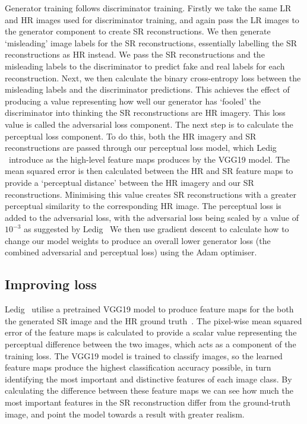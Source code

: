 Generator training follows discriminator training. Firstly we take the same LR and HR images used for discriminator training, and again pass the LR images to the generator component to create SR reconstructions. We then generate `misleading' image labels for the SR reconstructions, essentially labelling the SR reconstructions as HR instead. We pass the SR reconstructions and the misleading labels to the discriminator to predict fake and real labels for each reconstruction. Next, we then calculate the binary cross-entropy loss between the misleading labels and the discriminator predictions. This achieves the effect of producing a value representing how well our generator has `fooled' the discriminator into thinking the SR reconstructions are HR imagery. This loss value is called the adversarial loss component. The next step is to calculate the perceptual loss component. To do this, both the HR imagery and SR reconstructions are passed through our perceptual loss model, which Ledig \etal\ introduce as the high-level feature maps produces by the VGG19 model. The mean squared error is then calculated between the HR and SR feature maps to provide a `perceptual distance' between the HR imagery and our SR reconstructions. Minimising this value creates SR reconstructions with a greater perceptual similarity to the corresponding HR image. The perceptual loss is added to the adversarial loss, with the adversarial loss being scaled by a value of $10^{-3}$ as suggested by Ledig \etal\ We then use gradient descent to calculate how to change our model weights to produce an overall lower generator loss (the combined adversarial and perceptual loss) using the Adam optimiser.

\subsection{Improving loss}\label{subsec:improving_loss}
Ledig \etal\ utilise a pretrained VGG19 model to produce feature maps for the both the generated SR image and the HR ground truth~\cite{srgan}. The pixel-wise mean squared error of the feature maps is calculated to provide a scalar value representing the perceptual difference between the two images, which acts as a component of the training loss. The VGG19 model is trained to classify images, so the learned feature maps produce the highest classification accuracy possible, in turn identifying the most important and distinctive features of each image class. By calculating the difference between these feature maps we can see how much the most important features in the SR reconstruction differ from the ground-truth image, and point the model towards a result with greater realism.

